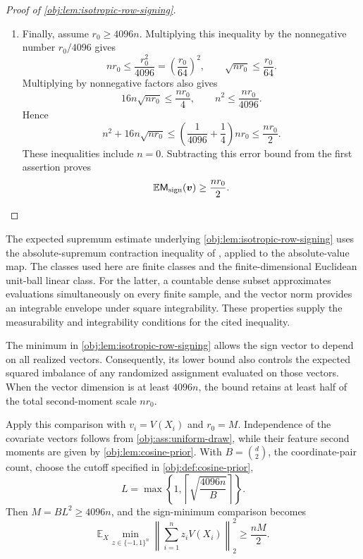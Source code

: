 \documentclass[11pt]{article}
\begin{document}
\begin{proof}[Proof of \cref{obj:lem:isotropic-row-signing}]
\begin{enumerate}
The diagonal-subtraction inequality and its expected diagonal energy now give
\[
\begin{aligned}
\mathbb E\mathsf M_{\rm sign}(\boldsymbol v)
&\geq nr_0-\mathbb E\mathsf M_{\rm off}(\boldsymbol v)\\
&\geq nr_0-n^2-16n\sqrt{nr_0}.
\end{aligned}
\]
Together with the small-sample case, this proves the first assertion for every \(n\).

\item Finally, assume \(r_0\geq4096n\). Multiplying this inequality by the nonnegative number \(r_0/4096\) gives
\[
nr_0\leq\frac{r_0^2}{4096}
=\left(\frac{r_0}{64}\right)^2,
\qquad
\sqrt{nr_0}\leq\frac{r_0}{64}.
\]
Multiplying by nonnegative factors also gives
\[
16n\sqrt{nr_0}\leq\frac{nr_0}{4},
\qquad
n^2\leq\frac{nr_0}{4096}.
\]
Hence
\[
n^2+16n\sqrt{nr_0}
\leq\left(\frac1{4096}+\frac14\right)nr_0
\leq\frac{nr_0}{2}.
\]
These inequalities include \(n=0\). Subtracting this error bound from the first assertion proves
\[
\mathbb E\mathsf M_{\rm sign}(\boldsymbol v)\geq\frac{nr_0}{2}.
\]
\end{enumerate}
\end{proof}

The expected supremum estimate underlying \cref{obj:lem:isotropic-row-signing} uses the absolute-supremum contraction inequality of \citet[Theorem~12(4), with Rademacher complexity as in Definition~2]{BartlettMendelson2002Complexities}, applied to the absolute-value map. The classes used here are finite classes and the finite-dimensional Euclidean unit-ball linear class. For the latter, a countable dense subset approximates evaluations simultaneously on every finite sample, and the vector norm provides an integrable envelope under square integrability. These properties supply the measurability and integrability conditions for the cited inequality.

The minimum in \cref{obj:lem:isotropic-row-signing} allows the sign vector to depend on all realized vectors. Consequently, its lower bound also controls the expected squared imbalance of any randomized assignment evaluated on those vectors. When the vector dimension is at least \(4096n\), the bound retains at least half of the total second-moment scale \(nr_0\).

Apply this comparison with \(v_i=V(X_i)\) and \(r_0=M\). Independence of the covariate vectors follows from \cref{obj:ass:uniform-draw}, while their feature second moments are given by \cref{obj:lem:cosine-prior}. With \(B=\binom d2\), the coordinate-pair count, choose the cutoff specified in \cref{obj:def:cosine-prior},
\[
L=\max\left\{1,\left\lceil\sqrt{\frac{4096n}{B}}\right\rceil\right\}.
\]
Then \(M=BL^2\geq4096n\), and the sign-minimum comparison becomes
\[
\mathbb E_X\min_{z\in\{-1,1\}^n}
\left\|\sum_{i=1}^n z_iV(X_i)\right\|_2^2
\geq\frac{nM}{2}.
\]
\end{document}
